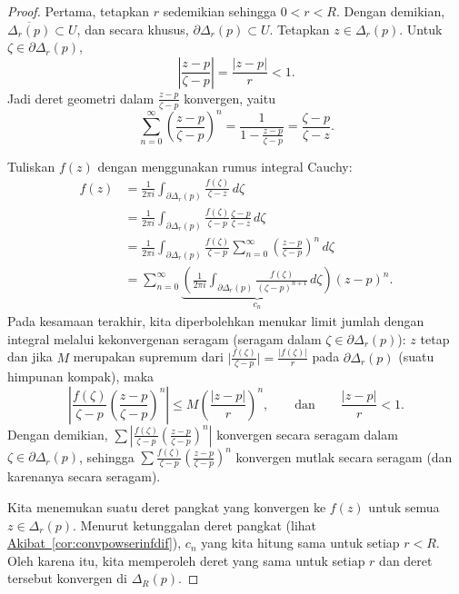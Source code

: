 \documentclass[12pt,openany]{book}
\newcommand{\sabs}[1]{\lvert {#1} \rvert}
\newcommand{\babs}[1]{\bigl\lvert {#1} \bigr\rvert}
\newcommand{\abs}[1]{\left\lvert {#1} \right\rvert}
\theoremstyle{plain}
\theoremstyle{remark}
\theoremstyle{definition}
\theoremstyle{exercise}
\theoremstyle{example}
\newcommand{\corref}[1]{\hyperref[#1]{Akibat~\ref*{#1}}}
\begin{document}
\begin{proof}
Pertama, tetapkan $r$ sedemikian sehingga $0 < r < R$.
Dengan demikian, $\overline{\Delta_r(p)} \subset U$, dan secara khusus,
$\partial \Delta_r(p) \subset U$.
Tetapkan $z \in \Delta_r(p)$.
Untuk $\zeta \in \partial \Delta_r(p)$, 
\begin{equation*}
\abs{\frac{z-p}{\zeta-p}} =
\frac{\sabs{z-p}}{r} < 1 .
\end{equation*}
Jadi deret geometri dalam $\frac{z-p}{\zeta-p}$ konvergen, yaitu
\begin{equation*}
\sum_{n=0}^\infty
{\left(\frac{z-p}{\zeta-p}\right)}^n
=
\frac{1}{1-\frac{z-p}{\zeta-p}}
=
\frac{\zeta-p}{\zeta-z} .
\end{equation*}

Tuliskan $f(z)$ dengan menggunakan rumus integral Cauchy:
\begin{equation*}
\begin{split}
f(z)
& =
\frac{1}{2\pi i}
\int_{\partial \Delta_r(p)}
\frac{f(\zeta)}{\zeta-z}
\,
d \zeta 
\\
& =
\frac{1}{2\pi i}
\int_{\partial \Delta_r(p)}
\frac{f(\zeta)}{\zeta-p}
\frac{\zeta-p}{\zeta-z}
\,
d \zeta 
\\
& =
\frac{1}{2\pi i}
\int_{\partial \Delta_r(p)}
\frac{f(\zeta)}{\zeta-p}
\sum_{n=0}^\infty
{\left(\frac{z-p}{\zeta-p}\right)}^n
\,
d \zeta 
\\
& =
\sum_{n=0}^\infty
\underbrace{
\left(
\frac{1}{2\pi i}
\int_{\partial \Delta_r(p)}
\frac{f(\zeta)}{{(\zeta-p)}^{n+1}}
\,
d \zeta 
\right)
}_{c_n}
{(z-p)}^n .
\end{split}
\end{equation*}
Pada kesamaan terakhir, kita diperbolehkan 
menukar limit jumlah dengan integral
melalui kekonvergenan seragam (seragam dalam $\zeta \in \partial \Delta_r(p)$):
$z$ tetap dan jika $M$ merupakan supremum dari $\babs{\frac{f(\zeta)}{\zeta-p}} =
\frac{\sabs{f(\zeta)}}{r}$ pada $\partial \Delta_r(p)$ (suatu himpunan kompak),
maka
\begin{equation*}
\abs{
\frac{f(\zeta)}{\zeta-p}
{\left(\frac{z-p}{\zeta-p}\right)}^n
}
\leq
M 
{\left(\frac{\abs{z-p}}{r}\right)}^n,
\qquad \text{dan} \qquad
\frac{\abs{z-p}}{r} < 1 .
\end{equation*}
Dengan demikian, $\sum 
\abs{
\frac{f(\zeta)}{\zeta-p}
{\left(\frac{z-p}{\zeta-p}\right)}^n
}$ konvergen secara seragam dalam $\zeta \in \partial \Delta_r(p)$, sehingga
$\sum 
\frac{f(\zeta)}{\zeta-p}
{\left(\frac{z-p}{\zeta-p}\right)}^n$ konvergen mutlak secara seragam
(dan karenanya secara seragam).

Kita menemukan suatu deret pangkat yang konvergen ke $f(z)$ untuk semua $z \in \Delta_r(p)$.
Menurut ketunggalan deret pangkat (lihat \corref{cor:convpowserinfdif}),
$c_n$ yang kita hitung sama untuk setiap $r < R$.  Oleh karena itu,
kita memperoleh deret yang sama untuk setiap $r$ dan deret tersebut konvergen di $\Delta_R(p)$.
\end{proof}
\end{document}

